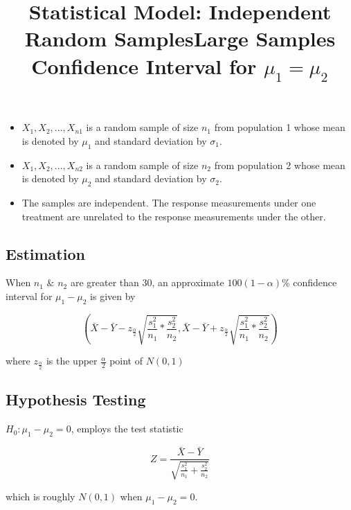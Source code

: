\documentclass{article}
\begin{document}
\begin{mdframed}
\title{Statistical Model: Independent Random Samples}
\begin{itemize}
    \item \(X_1, X_2, ..., X_{n1}\) is a random sample of size \(n_1\) from population 1 whose mean is denoted by \(\mu_1\) and standard deviation by \(\sigma_1\).
    \item \(X_1, X_2, ..., X_{n2}\) is a random sample of size \(n_2\) from population 2 whose mean is denoted by \(\mu_2\) and standard deviation by \(\sigma_2\).
    \item The samples are independent. The response measurements under one treatment are unrelated to the response measurements under the other.
\end{itemize}
\end{mdframed}

\subsection{Estimation}

\begin{mdframed}
\title{Large Samples Confidence Interval for \(\mu_1 = \mu_2\)}
When \(n_1\) \& \(n_2\) are greater than 30, an approximate \(100(1 - \alpha)\%\) confidence interval for \( \mu_1 - \mu_2\) is given by

\[
    (\bar{X} - \bar{Y} - z_{\frac{\alpha}{2}} \sqrt{\frac{s_1^2}{n_1} * \frac{s_2^2}{n_2}}, \bar{X} - \bar{Y} + z_{\frac{\alpha}{2}} \sqrt{\frac{s_1^2}{n_1} * \frac{s_2^2}{n_2}})
\]

where \(z_{\frac{\alpha}{2}}\) is the upper \(\frac{\alpha}{2}\) point of \(N(0, 1)\)
\end{mdframed}

\subsection{Hypothesis Testing}
\(H_0 : \mu_1 - \mu_2 = 0\), employs the test statistic

\[
    Z = \frac{\bar{X} - \bar{Y}}{\sqrt{\frac{s_1^2}{n_1} + \frac{s_2^2}{n_2}}}
\]

which is roughly \(N(0, 1)\) when \(\mu_1 - \mu_2 = 0\).
\end{document}
